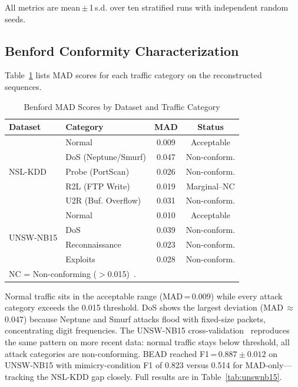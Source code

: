 \documentclass[conference]{IEEEtran}
\begin{document}
All metrics are mean\,$\pm$\,1\,s.d. over ten stratified runs with
independent random seeds.

\subsection{Benford Conformity Characterization}

Table~\ref{tab:mad} lists MAD scores for each traffic category on the
reconstructed sequences.

\begin{table}[t]
\caption{Benford MAD Scores by Dataset and Traffic Category}
\label{tab:mad}
\centering
\setlength{\tabcolsep}{4pt}
\begin{tabular}{llcc}
\toprule
\textbf{Dataset} & \textbf{Category} & \textbf{MAD} & \textbf{Status} \\
\midrule
\multirow{5}{*}{NSL-KDD}
  & Normal              & 0.009 & Acceptable     \\
  & DoS (Neptune/Smurf) & 0.047 & Non-conform.   \\
  & Probe (PortScan)    & 0.026 & Non-conform.   \\
  & R2L (FTP Write)     & 0.019 & Marginal--NC   \\
  & U2R (Buf. Overflow) & 0.031 & Non-conform.   \\
\midrule
\multirow{4}{*}{UNSW-NB15}
  & Normal              & 0.010 & Acceptable     \\
  & DoS                 & 0.039 & Non-conform.   \\
  & Reconnaissance      & 0.023 & Non-conform.   \\
  & Exploits            & 0.028 & Non-conform.   \\
\bottomrule
\multicolumn{4}{l}{\footnotesize NC = Non-conforming ($>$0.015)~\cite{b6}.}
\end{tabular}
\end{table}

Normal traffic sits in the acceptable range (MAD\,=\,0.009) while every
attack category exceeds the 0.015 threshold. DoS shows the largest
deviation (MAD\,$\approx$\,0.047) because Neptune and Smurf attacks
flood with fixed-size packets, concentrating digit frequencies. The
UNSW-NB15 cross-validation~\cite{b20} reproduces the same pattern on
more recent data: normal traffic stays below threshold, all attack
categories are non-conforming. BEAD reached F1\,=\,$0.887\pm0.012$ on
UNSW-NB15 with mimicry-condition F1 of 0.823 versus 0.514 for
MAD-only—tracking the NSL-KDD gap closely. Full results are in
Table~\ref{tab:unswnb15}.
\end{document}

